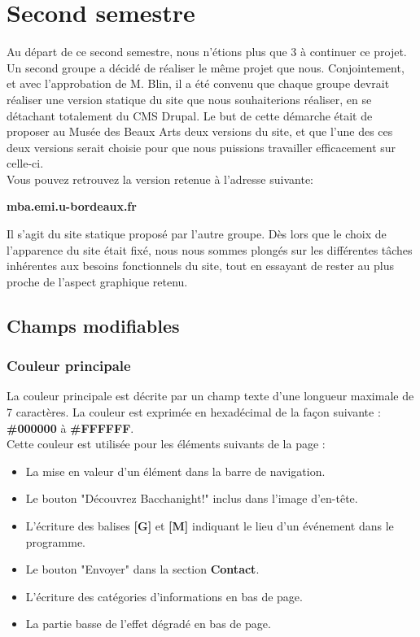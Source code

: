 \documentclass[11pt]{report}
\begin{document}
\vspace{0.5cm}

\section{Second semestre}

Au départ de ce second semestre, nous n'étions plus que 3 à continuer ce projet.
Un second groupe a décidé de réaliser le même projet que nous. Conjointement,
et avec l'approbation de M. Blin, il a été convenu que chaque groupe devrait
réaliser une version statique du site que nous souhaiterions réaliser, en se
détachant totalement du CMS Drupal. Le but de cette démarche était de proposer au
Musée des Beaux Arts deux versions du site, et que l'une des ces deux versions serait
choisie pour que nous puissions travailler efficacement sur celle-ci.\\
Vous pouvez retrouvez la version retenue à l'adresse suivante:

\vspace{0.5cm}

\textbf{mba.emi.u-bordeaux.fr}\\

\par
Il s'agit du site statique proposé par l'autre groupe. Dès lors que le choix de
l'apparence du site était fixé, nous nous sommes plongés sur les différentes tâches
inhérentes aux besoins fonctionnels du site, tout en essayant de rester au plus
proche de l'aspect graphique retenu.


\subsection{Champs modifiables}

\subsubsection{Couleur principale}

La couleur principale est décrite par un champ texte d'une longueur maximale de
7 caractères. La couleur est exprimée en hexadécimal de la façon suivante :
\textbf{\#000000} à \textbf{\#FFFFFF}. \\
Cette couleur est utilisée pour les éléments suivants de la page :
\begin{itemize}
	\item La mise en valeur d'un élément dans la barre de navigation.
	\item Le bouton "Découvrez Bacchanight!" inclus dans l'image d'en-tête.
	\item L'écriture des balises \textbf{[G]} et \textbf{[M]} indiquant le lieu d'un événement dans le programme.
	\item Le bouton "Envoyer" dans la section \textbf{Contact}.
	\item L'écriture des catégories d'informations en bas de page.
	\item La partie basse de l'effet dégradé en bas de page.
\end{itemize}
\end{document}
